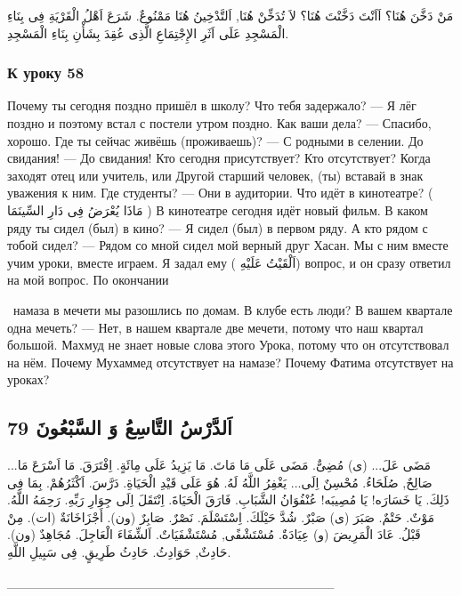 \documentclass[a5paper]{article}
\begin{document}
مَنْ دَخَّنَ هُنَا؟ اَاَنْتَ دَخَّنْتَ هُنَا؟ لاَ تُدَخِّنْ هُنَا, اَلتَّدْخِينُ هُنَا مَمْنُوعٌ. شَرَعَ اَهْلُ الْقَرْيَةِ فِى بِنَاءِ الْمَسْجِدِ عَلَى اَثَرِ الإِجْتِمَاعِ الَّذِى عُقِدَ بِشَأْنِ بِنَاءِ الْمَسْجِدِ.

\subsubsection{К уроку 58}
Почему ты сегодня поздно пришёл в школу? Что тебя задержало? — Я лёг поздно и поэтому встал с постели утром поздно. Как ваши дела? — Спасибо, хорошо. Где ты сейчас живёшь (проживаешь)? — С родными в селении. До свидания! — До свидания! Кто сегодня присутствует? Кто отсутствует? Когда заходят отец или учитель, или Другой старший человек, (ты) вставай в знак уважения к ним. Где студенты? — Они в аудитории. Что идёт в кинотеатре? ( مَاذَا يُعْرَضُ فِى دَارِ السِّينَمَا ) В кинотеатре сегодня идёт новый фильм. В каком ряду ты сидел (был) в кино? — Я сидел (был) в первом ряду. А кто рядом с тобой сидел? — Рядом со мной сидел мой верный друг Хасан. Мы с ним вместе учим уроки, вместе играем. Я задал ему ( اَلْقَيْتُ عَلَيْهِ) вопрос, и он сразу ответил на мой вопрос. По окончании

\ намаза в мечети мы разошлись по домам. В клубе есть люди? В вашем квартале одна мечеть? — Нет, в нашем квартале две мечети, потому что наш квартал большой. Махмуд не знает новые слова этого Урока, потому что он отсутствовал на нём. Почему Мухаммед отсутствует на намазе? Почему Фатима отсутствует на уроках?

\subsection{اَلدَّرْسُ التَّاسِعُ وَ السَّبْعُونَ 79}
مَضَى عَلَ... (ى) مُضِىٌّ. مَضَى عَلَى مَا مَاتَ. مَا يَزِيدُ عَلَى مِائَةٍ. اِفْتَرَقَ. مَا اَسْرَعَ مَا... صَالِحٌ, صُلَحَاءُ. مُحْسِنٌ اِلَى... يَغْفِرُ اللَّهُ لَهُ. هُوَ عَلَى قَيْدِ الْحَيَاةِ. دَرَّسَ. اَكْثَرُهُمْ. بِمَا فِى ذَلِكَ. يَا خَسَارَه! يَا مُصِيبَه! عُنْفُوَانُ الشَّبَابِ. فَارَقَ الْحَيَاةَ. اِنْتَقَلَ اِلَى جِوَارِ رَبِّهِ. رَحِمَهُ اللَّهُ. مَوْتٌ. حَتْمٌ. صَبَرَ (ى) صَبْرٌ. شُدَّ حَيْلَكَ. اِسْتَسْلَمَ. نَصْرٌ. صَابِرٌ (ون). أَجْزَاخَانَةٌ (ات). مِنْ قَبْلُ. عَادَ الْمَرِيضَ (و) عِيَادَةٌ. مُسْتَشْفًى, مُسْتَشْفَيَاتٌ. اَلشِّفَاءَ الْعَاجِلَ. مُجَاهِدٌ (ون). حَادِثٌ, حَوَادِثُ. حَادِثُ طَرِيقٍ. فِى سَبِيلِ اللَّهِ.

\_\_\_\_\_\_\_\_\_\_\_\_\_\_\_\_\_\_\_\_\_\_\_\_\_\_\_\_\_\_\_\_\_\_\_
\end{document}
